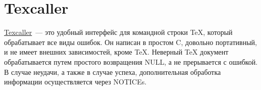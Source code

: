 \section{Texcaller}

\href{http://www.profv.de/texcaller/}{Texcaller}~--- это удобный интерфейс для командной строки TeX, который обрабатывает все виды ошибок. Он написан в простом C, довольно портативный, и не имеет внешних зависимостей, кроме TeX. Неверный TeX документ обрабатывается путем простого возвращения NULL, а не прерывается с ошибкой. В случае неудачи, а также в случае успеха, дополнительная обработка информации осуществляется через NOTICEs.